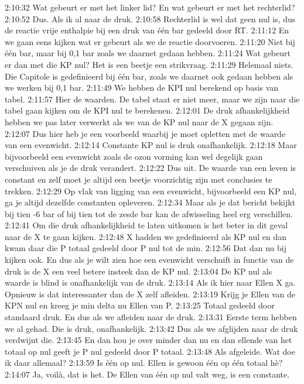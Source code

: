 2:10:32
Wat gebeurt er met het linker lid? En wat gebeurt er met het rechterlid?
2:10:52
Dus. Als ik al naar de druk.
2:10:58
Rechterlid is wel dat geen nul is, dus de reactie vrije enthalpie bij een druk van één bar gedeeld door RT.
2:11:12
En we gaan eens kijken wat er gebeurt als we de reactie doorvoeren.
2:11:20
Niet bij één bar, maar bij 0,1 bar zoals we daarnet gedaan hebben.
2:11:24
Wat gebeurt er dan met die KP nul? Het is een beetje een strikvraag.
2:11:29
Helemaal niets. Die Capitole is gedefinieerd bij één bar, zoals we daarnet ook gedaan hebben als we werken bij 0,1 bar.
2:11:49
We hebben de KPI nul berekend op basis van tabel.
2:11:57
Hier de waarden. De tabel staat er niet meer, maar we zijn naar die tabel gaan kijken om de KPI nul te berekenen.
2:12:01
De druk afhankelijkheid hebben we pas later verwerkt als we van de KP nul naar de X gegaan zijn.
2:12:07
Dus hier heb je een voorbeeld waarbij je moet opletten met de waarde van een evenwicht.
2:12:14
Constante KP nul is druk onafhankelijk.
2:12:18
Maar bijvoorbeeld een evenwicht zoals de ozon vorming kan wel degelijk gaan verschuiven als je de druk verandert.
2:12:22
Dus uit. De waarde van een leven is constant en zelf moet je altijd een beetje voorzichtig zijn met conclusies te trekken.
2:12:29
Op vlak van ligging van een evenwicht, bijvoorbeeld een KP nul, ga je altijd dezelfde constanten opleveren.
2:12:34
Maar als je dat bericht bekijkt bij tien -6 bar of bij tien tot de zesde bar kan de afwisseling heel erg verschillen.
2:12:41
Om die druk afhankelijkheid te laten uitkomen is het beter in dit geval naar de X te gaan kijken.
2:12:48
X hadden we gedefinieerd als KP nul en dan kwam daar die P totaal gedeeld door P nul tot de min.
2:12:56
Dat dan nu bij kijken ook. En dus als je wilt zien hoe een evenwicht verschuift in functie van de druk is de X een veel betere insteek dan de KP nul.
2:13:04
De KP nul als waarde is blind is onafhankelijk van de druk.
2:13:14
Als ik hier naar Ellen X ga. Opnieuw is dat interessanter dan de X zelf afleiden.
2:13:19
Krijg je Ellen van de KPN nul en kreeg je min delta nu Ellen van P.
2:13:25
Totaal gedeeld door standaard druk. En dus als we afleiden naar de druk.
2:13:31
Eerste term hebben we al gehad. Die is druk, onafhankelijk.
2:13:42
Dus als we afglijden naar de druk verdwijnt die.
2:13:45
En dan hou je over minder dan nu en dan ellende van het totaal op nul geeft je P nul gedeeld door P totaal.
2:13:48
Als afgeleide. Wat doe ik daar allemaal?
2:13:59
Is één op nul. Ellen is gewoon één op één totaal hè?
2:14:07
Ja, voilà, dat is het. De Ellen van één op nul valt weg, is een constante.
